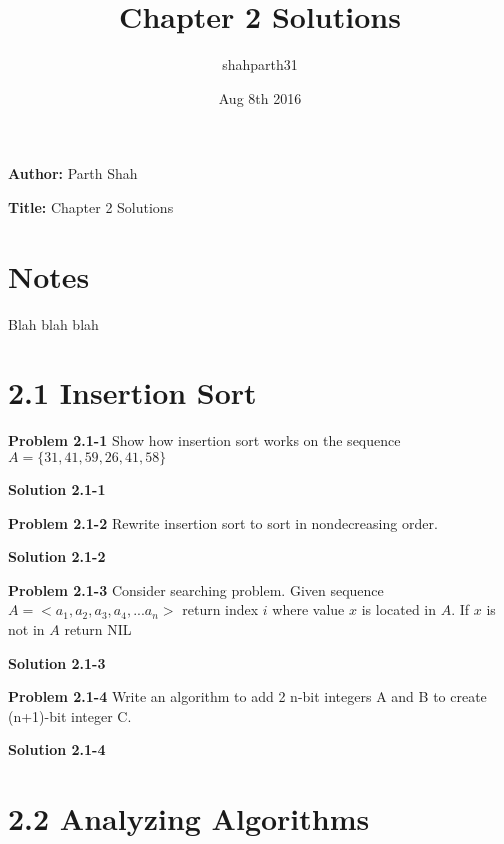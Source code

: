 \documentclass{article}
\title{Chapter 2 Solutions}
\author{shahparth31}
\date{Aug 8th 2016}
\begin{document}
\setlength{\parindent}{0pt}

\medskip

\hrulefill

\medskip

{\bf Author:} Parth Shah

\medskip

{\bf Title:} Chapter 2 Solutions

\hrulefill

\section*{Notes}

Blah blah blah

\section*{2.1 Insertion Sort}

\hrulefill

\medskip

\textbf{Problem 2.1-1} Show how insertion sort works on the sequence $A = \{ 31, 41, 59, 26, 41, 58 \}$

\medskip

\textbf{Solution 2.1-1}

\hrulefill

\medskip

\textbf{Problem 2.1-2} Rewrite insertion sort to sort in nondecreasing order.

\medskip

\textbf{Solution 2.1-2}

\hrulefill

\medskip

\textbf{Problem 2.1-3} Consider searching problem. Given sequence $A =  <a_1, a_2, a_3, a_4, ... a_n>$ return index $i$ where value $x$ is located in $A$. If $x$ is not in $A$ return NIL

\medskip

\textbf{Solution 2.1-3}

\hrulefill

\medskip

\textbf{Problem 2.1-4} Write an algorithm to add 2 n-bit integers A and B to create (n+1)-bit integer C.

\medskip

\textbf{Solution 2.1-4}

\hrulefill

\section*{2.2 Analyzing Algorithms}
\end{document}
